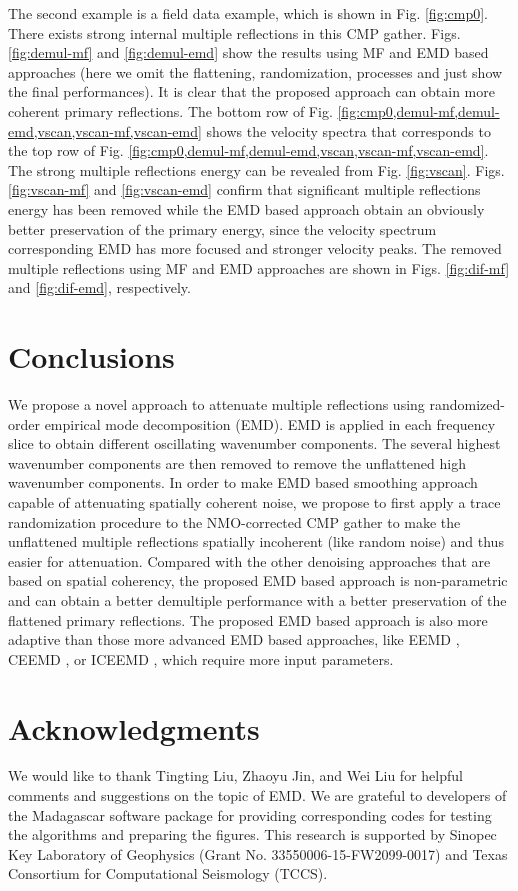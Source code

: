 The second example is a field data example, which is shown in Fig. \ref{fig:cmp0}.
There exists strong internal multiple reflections in this CMP gather. Figs. \ref{fig:demul-mf} and \ref{fig:demul-emd} show the results using MF and EMD based approaches (here we omit the flattening, randomization, processes and just show the final performances). It is clear that the proposed approach can obtain more coherent primary reflections. The bottom row of Fig. \ref{fig:cmp0,demul-mf,demul-emd,vscan,vscan-mf,vscan-emd} shows the velocity spectra that corresponds to the top row of Fig. \ref{fig:cmp0,demul-mf,demul-emd,vscan,vscan-mf,vscan-emd}. The strong multiple reflections energy can be revealed from Fig. \ref{fig:vscan}. Figs. \ref{fig:vscan-mf} and \ref{fig:vscan-emd} confirm that significant multiple reflections energy has been removed while the EMD based approach obtain an obviously better preservation of the primary energy, since the velocity spectrum corresponding EMD has more focused and stronger velocity peaks. The removed multiple reflections using MF and EMD approaches are shown in Figs. \ref{fig:dif-mf} and \ref{fig:dif-emd}, respectively. 

\section{Conclusions}
We propose a novel approach to attenuate multiple reflections using randomized-order empirical mode decomposition (EMD). EMD is applied in each frequency slice to obtain different oscillating wavenumber components. The several highest wavenumber components are then removed to remove the unflattened high wavenumber components. In order to make EMD based smoothing approach capable of attenuating spatially coherent noise, we propose to first apply a trace randomization procedure to the NMO-corrected CMP gather to make the unflattened multiple reflections spatially incoherent (like random noise) and thus easier for attenuation. Compared with the other denoising approaches that are based on spatial coherency, the proposed EMD based approach is non-parametric and can obtain a better demultiple performance with a better preservation of the flattened primary reflections. The proposed EMD based approach is also more adaptive than those more advanced EMD based approaches, like EEMD \cite{eemd}, CEEMD \cite{epsceemd}, or ICEEMD \cite{iceemd2014}, which require more input parameters.

\section{Acknowledgments}
We would like to thank Tingting Liu, Zhaoyu Jin, and Wei Liu for helpful comments and suggestions on the topic of EMD. We are grateful to developers of the Madagascar software package for providing corresponding codes for testing the algorithms and preparing the figures. This research is supported by Sinopec Key Laboratory of Geophysics (Grant No. 33550006-15-FW2099-0017) and Texas Consortium for Computational Seismology (TCCS).












